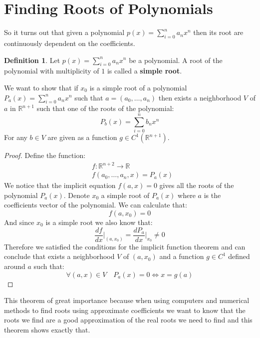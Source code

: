 \documentclass[11pt,a4paper]{article}
\theoremstyle{definition}
\newtheorem{definition}{Definition}[section]
\theoremstyle{plain}
\newcommand{\R}{\mathbb{R}}
\begin{document}
	\section{Finding Roots of Polynomials}
	So it turns out that given a polynomial $p(x) = \sum_{i=0}^{n}{a_n x^n}$
	then its root are continuously dependent on the coefficients.
	\begin{definition}
		Let $p(x) = \sum_{i=0}^{n}{a_n x^n}$ be a polynomial. A root of the
		polynomial with multiplicity of $1$ is called a \textbf{simple root}.
	\end{definition}
	We want to show that if $x_0$ is a simple root of a polynomial 
	$P_a(x) = \sum_{i=0}^{n}{a_n x^n}$ such that $a = (a_0,\dots,a_n)$
	then exists a neighborhood $V$ of $a$ in $\R^{n+1}$ such that one of the
	roots of the polynomial:
	\[
		P_b(x) = \sum_{i=0}^{n}{b_n x^n}
	\]
	For any $b \in V$ are given as a function $g \in C^1(\R^{n+1})$.
	\begin{proof}
		Define the function:
		\begin{align*}
			&f \colon \R^{n + 2} \to \R \\
			&f(a_0,\dots,a_n,x) = P_a(x)
		\end{align*}
		We notice that the implicit equation $f(a,x) = 0$ gives all the roots
		of the polynomial $P_a(x)$. Denote $x_0$ a simple root of $P_a(x)$
		where $a$ is the coefficients vector of the polynomial. We
		can calculate that:
		\[
			f(a,x_0) = 0
		\]
		And since $x_0$ is a simple root we also know that:
		\[
			\frac{df}{dx}\biggr\vert_{(a,x_0)} = 
			\frac{dP_{a}}{dx}\biggr\vert_{x_0} \neq 0 
		\]
		Therefore we satisfied the conditions for the implicit function
		theorem and can conclude that exists a neighborhood $V$ of $(a,x_0)$
		and a function $g \in C^1$ defined around $a$ such that:
		\[
			\forall (a,x) \in V \quad P_a(x) = 0 \iff x = g(a)
		\]
	\end{proof}
	This theorem of great importance because when using computers and 
	numerical methods to find roots using approximate coefficients we want
	to know that the roots we find are a good approximation of the real
	roots we need to find and this theorem shows exactly that.
	
	\newpage
	
\end{document}
